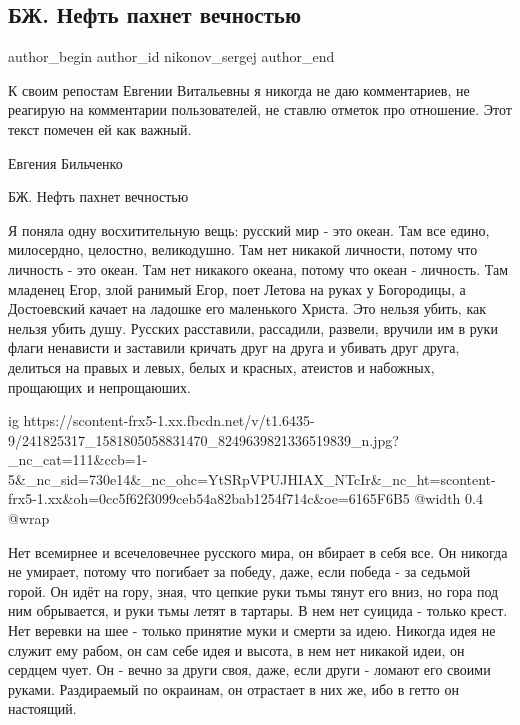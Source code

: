  
 
 
 
 
 
\subsection{БЖ. Нефть пахнет вечностью}
\label{sec:15_09_2021.fb.nikonov_sergej.1.bilchenko_rusmir_neft_vechnost}
 
\ifcmt
 author_begin
   author_id nikonov_sergej
 author_end
\fi

К своим репостам Евгении Витальевны я никогда не даю комментариев, не реагирую
на комментарии пользователей, не ставлю отметок про отношение. Этот текст
помечен ей как важный.

Евгения Бильченко

БЖ. Нефть пахнет вечностью

Я поняла одну восхитительную вещь: русский мир - это океан. Там все едино,
милосердно, целостно, великодушно. Там нет никакой личности, потому что
личность - это океан. Там нет никакого океана, потому что океан - личность. Там
младенец Егор, злой ранимый Егор, поет Летова на руках у Богородицы, а
Достоевский качает на ладошке его маленького Христа. Это нельзя убить, как
нельзя убить душу. Русских расставили, рассадили, развели, вручили им в руки
флаги ненависти и заставили кричать друг на друга и убивать друг друга,
делиться на правых и левых, белых и красных, атеистов и набожных, прощающих и
непрощаюших.

\ifcmt
  ig https://scontent-frx5-1.xx.fbcdn.net/v/t1.6435-9/241825317_1581805058831470_8249639821336519839_n.jpg?_nc_cat=111&ccb=1-5&_nc_sid=730e14&_nc_ohc=YtSRpVPUJHIAX_NTcIr&_nc_ht=scontent-frx5-1.xx&oh=0cc5f62f3099ceb54a82bab1254f714c&oe=6165F6B5
  @width 0.4
  @wrap 
\fi

Нет всемирнее и всечеловечнее русского мира, он вбирает в себя все. Он никогда
не умирает, потому что погибает за победу, даже, если победа - за седьмой
горой. Он идёт на гору, зная, что цепкие руки тьмы тянут его вниз, но гора под
ним обрывается, и руки тьмы летят в тартары. В нем нет суицида - только крест.
Нет веревки на шее - только принятие муки и смерти за идею. Никогда идея не
служит ему рабом, он сам себе идея и высота, в нем нет никакой идеи, он сердцем
чует. Он - вечно за други своя, даже, если други - ломают его своими руками.
Раздираемый по окраинам, он отрастает в них же, ибо в гетто он настоящий.

